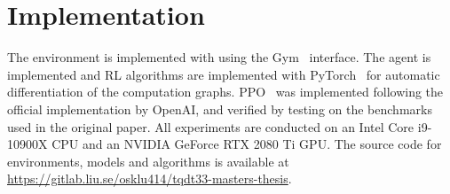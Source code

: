 %

\section{Implementation}

The environment is implemented with using the Gym~\cite{brockman_openai_2016} interface. The agent is implemented and RL algorithms are implemented with PyTorch~\cite{paszke_pytorch_2019} for automatic differentiation of the computation graphs.
PPO~\cite{schulman_proximal_2017} was implemented following the official implementation by OpenAI,
and verified by testing on the benchmarks used in the original paper.
All experiments are conducted on an Intel Core i9-10900X CPU and an NVIDIA GeForce RTX 2080 Ti GPU.
The source code for environments, models and algorithms is available at \url{https://gitlab.liu.se/osklu414/tqdt33-masters-thesis}.
